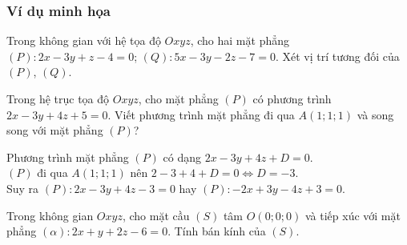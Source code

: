 \subsubsection{Ví dụ minh họa}
\begin{vd}%
	Trong không gian với hệ tọa độ $ Oxyz $, cho hai mặt phẳng $ (P)\colon 2x-3y+z-4=0 $; $ (Q)\colon 5x-3y-2z-7=0 $. Xét vị trí tương đối của $ (P) $, $ (Q) $.
\end{vd}
\begin{vd}%
	
	Trong hệ trục tọa độ $Oxyz$, cho mặt phẳng $(P)$ có phương trình $2x-3y+4z+5=0$. Viết phương trình mặt phẳng đi qua $A(1; 1;1)$ và song song với mặt phẳng $(P)$?

	\loigiai
	{
		Phương trình mặt phẳng $(P)$ có dạng $2x-3y+4z+D=0$.\\
		$(P)$ đi qua $A(1; 1; 1)$ nên $2-3+4+D=0\Leftrightarrow D=-3$.\\
		Suy ra $(P):2x-3y+4z-3=0$ hay $(P):-2x+3y-4z+3=0$.
	}
\end{vd}
\begin{vd}%
	Trong không gian $Oxyz$, cho mặt cầu $(S)$ tâm $O(0;0;0)$ và tiếp xúc với mặt phẳng $(\alpha)\colon 2x+y+2z-6=0$. Tính bán kính của $(S)$.
\end{vd}

